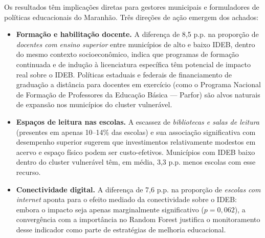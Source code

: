 Os resultados têm implicações diretas para gestores municipais e formuladores de políticas educacionais do Maranhão. Três direções de ação emergem dos achados:
\begin{itemize}
  \item \textbf{Formação e habilitação docente.} A diferença de 8,5 p.p. na proporção de \textit{docentes com ensino superior} entre municípios de alto e baixo IDEB, dentro do mesmo contexto socioeconômico, indica que programas de formação continuada e de indução à licenciatura específica têm potencial de impacto real sobre o IDEB. Políticas estaduais e federais de financiamento de graduação a distância para docentes em exercício (como o Programa Nacional de Formação de Professores da Educação Básica --- Parfor) são alvos naturais de expansão nos municípios do cluster vulnerável.

  \item \textbf{Espaços de leitura nas escolas.} A escassez de \textit{bibliotecas e salas de leitura} (presentes em apenas 10--14\% das escolas) e sua associação significativa com desempenho superior sugerem que investimentos relativamente modestos em acervo e espaço físico podem ser custo-efetivos. Municípios com IDEB baixo dentro do cluster vulnerável têm, em média, 3,3 p.p. menos escolas com esse recurso.

  \item \textbf{Conectividade digital.} A diferença de 7,6 p.p. na proporção de \textit{escolas com internet} aponta para o efeito mediado da conectividade sobre o IDEB: embora o impacto seja apenas marginalmente significativo ($p = 0{,}062$), a convergência com a importância no Random Forest justifica o monitoramento desse indicador como parte de estratégias de melhoria educacional.
\end{itemize}